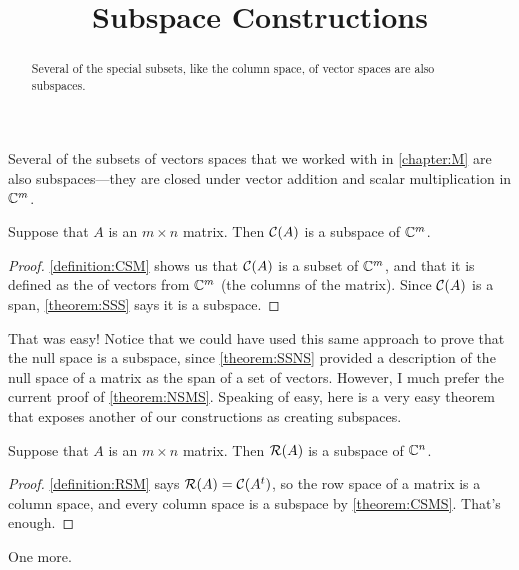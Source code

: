 \documentclass{ximera}
\title{Subspace Constructions}
\begin{document}
\begin{abstract}
  Several of the special subsets, like the column space, of vector spaces are also subspaces.
\end{abstract}
\maketitle

Several of the subsets of vectors spaces that we worked with in
\ref{chapter:M} are also subspaces---they are closed under vector
addition and scalar multiplication in $\mathbb{C}^{m}$.

\begin{theorem}
  \label{theorem:CSMS}

  Suppose that $A$ is an $m\times n$ matrix.  Then $\mathcal{C}\!\left(A\right)$ is a subspace of $\mathbb{C}^{m}$.

  \begin{proof}
    \ref{definition:CSM} shows us that $\mathcal{C}\!\left(A\right)$ is a subset of
    $\mathbb{C}^{m}$, and that it is defined as the
     of
    vectors from $\mathbb{C}^{m}$ (the columns of the matrix).  Since
    $\mathcal{C}\!\left(A\right)$ is a span, \ref{theorem:SSS} says it is a subspace.
  \end{proof}
\end{theorem}

That was easy!  Notice that we could have used this same approach to
prove that the null space is a subspace, since \ref{theorem:SSNS}
provided a description of the null space of a matrix as the span of a
set of vectors.  However, I much prefer the current proof of
\ref{theorem:NSMS}.  Speaking of easy, here is a very easy theorem
that exposes another of our constructions as creating subspaces.

\begin{theorem}
  \label{theorem:RSMS}

  Suppose that $A$ is an $m\times n$ matrix.  Then $\mathcal{R}\!\left(A\right)$ is a
  subspace of $\mathbb{C}^{n}$.

  \begin{proof}
    \ref{definition:RSM} says $\mathcal{R}\!\left(A\right)=\mathcal{C}\!\left(A^{t}\right)$, so the
    row space of a matrix is a column space, and every column space is
    a subspace by \ref{theorem:CSMS}.  That's enough.
  \end{proof}
\end{theorem}

One more.
\end{document}
